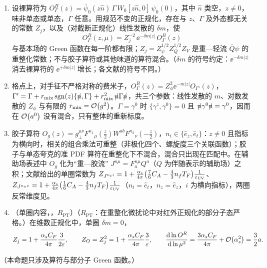 \begin{proposition}\label{prop:lattice-renormalizability}
\begin{enumerate}[label=(\alph*),leftmargin=2em,itemsep=1pt,topsep=2pt]
\item 设裸算符为 $O^B_\Gamma(z)=\bar\psi_0(z\hat n)\,\Gamma\, W_0[z\hat n,0]\,\psi_0(0)$，其中 $\hat n$ 类空，$z\neq0$，味非单态或单态，$\Gamma$ 任意。用规范不变的正规化，存在与 $z$、$\Gamma$ 及外态都无关的常数 $Z_j$，以及（对截断正规化）线性发散的 $\delta m$，使
\begin{equation}\label{eq:lamet-multren}
O^R_\Gamma(z,\mu)=Z_j^{-2}\,\ee^{-\delta m|z|}\,O^B_\Gamma(z)
\end{equation}
与基本场的 Green 函数在每一阶都有限；$Z_j=Z_\psi^{1/2}Z_Q^{1/2}Z_V$ 是重—轻流 $\bar Q\psi$ 的重整化常数；不与胶子算符或其他味道的算符混合。（$\delta m$ 的符号约定：$\ee^{-\delta m|z|}$ 消去裸算符的 $\ee^{+\delta m|z|}$ 增长；各文献的符号不同。）%
\item 格点上，对手征不严格对称的费米子，$O^R_\Gamma(z)=Z_\phi^2\ee^{-m|z|}O_{\Gamma'}(z)$，$\Gamma'=\Gamma+r_{\rm mix}\,{\rm sgn}(z)\{\slashed{n},\Gamma\}+r_{\rm mix}^2\,\slashed{n}\Gamma\slashed{n}$，共三个参数：线性发散的 $m$、对数发散的 $Z_\phi$ 与有限的 $r_{\rm mix}=\mathcal{O}\!\left(g^2\right)$。$\Gamma=\gamma^0$ 时 $\{\gamma^z,\gamma^0\}=0$ 且 $\slashed{n}\gamma^0\slashed{n}=\gamma^0$，因而在 $\mathcal{O}\!\left(a^0\right)$ 没有混合，只有整体的重新标度。
\item 胶子算符 $O_g(z)=g_\perp^{\mu\nu}F^{n_1}{}_\mu(\tfrac z2)W^{ab}F^{n_2}{}_\nu(-\tfrac z2)$，$n_i\in\{\hat e_z,\hat e_t\}$：$z\neq0$ 且指标为横向时，相关的组合乘法可重整（非极化四个、螺旋度三个关联函数）；胶子与单态夸克的准 PDF 算符在重整化下不混合，混合只出现在匹配中。在辅助场表述中 $O_g$ 化为“重—胶流” $J^{n\mu}=F^{n\mu}_aQ^a$（$Q$ 为伴随表示的辅助场）之积；文献\cite[第~III.A~节]{JiEtAl2021}给出的单圈常数为 $Z_{J^{n_ti}}=1+\frac{\alpha_s}{4\pi}\big(\frac76C_A-\frac43n_fT_F\big)\frac1{\varepsilon_{\rm UV}}$、$Z_{J^{n_z\nu}}=1+\frac{\alpha_s}{4\pi}\big(\frac16C_A-\frac43n_fT_F\big)\frac1{\varepsilon_{\rm UV}}$（$n_t=\hat e_t$，$n_z=\hat e_z$，$i$ 为横向指标），两圈反常维度见\cite{Braun:2020ymy}。
\item （单圈内容，\tagR，$R_{\mathrm{PT}}$）（$R_{\mathrm{PT}}$：在重整化微扰论中对红外正规化的部分子态严格。）在维数正规化中，单圈 $\delta m=0$，
\begin{equation}\label{eq:lamet-Zj}
Z_j=1+\frac{\alpha_s C_F}{4\pi}\frac3{2\varepsilon},\qquad Z_O=Z_j^2=1+\frac{\alpha_s C_F}{4\pi}\frac3\varepsilon,\qquad\frac{\mathrm{d}\ln O^R}{\mathrm{d}\ln\mu^2}=\frac{3\alpha_s C_F}{4\pi}+\mathcal{O}\!\left(\alpha_s^2\right)=\frac32a .
\end{equation}
\end{enumerate}
（本命题只涉及算符与部分子 Green 函数。）
\end{proposition}

